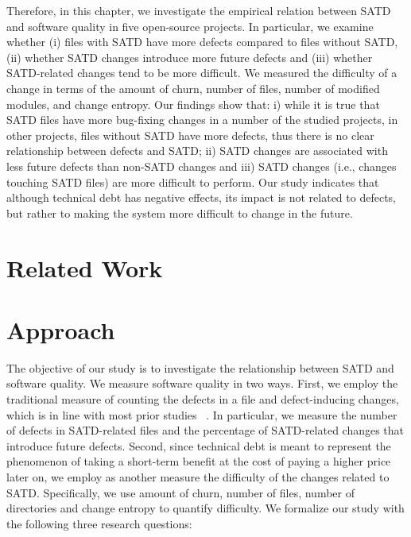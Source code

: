 Therefore, in this chapter, we investigate the empirical relation between SATD and software quality in five open-source projects. In particular, we examine whether (i) files with SATD have more defects compared to files without SATD, (ii) whether SATD changes introduce more future defects and (iii) whether SATD-related changes tend to be more difficult. We measured the difficulty of a change in terms of the amount of churn, number of files, number of modified modules, and change entropy. Our findings show that: i) while it is true that SATD files have more bug-fixing changes in a number of the studied projects, in other projects, files without SATD have more defects, thus there is no clear relationship between defects and SATD; ii) SATD changes are associated with less future defects than non-SATD changes and iii) SATD changes (i.e., changes touching SATD files) are more difficult to perform. Our study indicates that although technical debt has negative effects, its impact is not related to defects, but rather to making the system more difficult to change in the future.


\section{Related Work}
\label{chap3:sec:related_work}

\section{Approach}
\label{chap3:sec:approach}

The objective of our study is to investigate the relationship between SATD and software quality. We measure software quality in two ways. First, we employ the traditional measure of counting the defects in a file and defect-inducing changes, which is in line with most prior studies ~\cite{Kamei-tse-2013,Kim-tse-2008,sliwerski-msr-2005}. In particular, we measure the number of defects in SATD-related files and the percentage of SATD-related changes that introduce future defects. Second, since technical debt is meant to represent the phenomenon of taking a short-term benefit at the cost of paying a higher price later on, we employ as another measure the difficulty of the changes related to SATD. Specifically, we use amount of churn, number of files, number of directories and change entropy to quantify difficulty. We formalize our study with the following three research questions:


